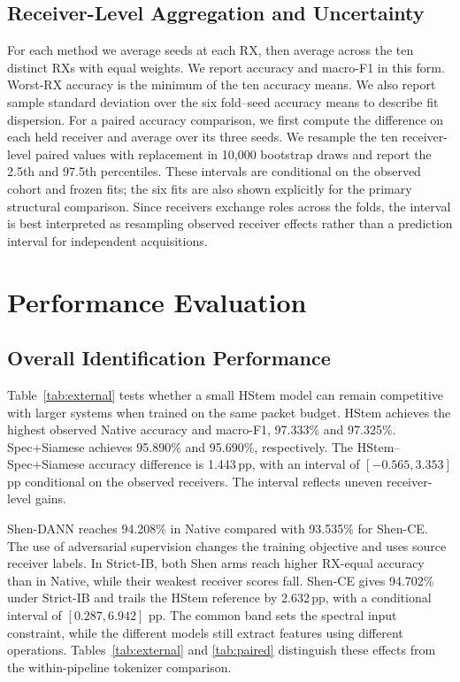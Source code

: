 \documentclass[journal]{IEEEtran}
\begin{document}
\subsection{Receiver-Level Aggregation and Uncertainty}
For each method we average seeds at each RX, then average across the ten distinct RXs with equal weights. We report accuracy and macro-F1 in this form. Worst-RX accuracy is the minimum of the ten accuracy means. We also report sample standard deviation over the six fold--seed accuracy means to describe fit dispersion. For a paired accuracy comparison, we first compute the difference on each held receiver and average over its three seeds. We resample the ten receiver-level paired values with replacement in 10,000 bootstrap draws and report the 2.5th and 97.5th percentiles. These intervals are conditional on the observed cohort and frozen fits; the six fits are also shown explicitly for the primary structural comparison. Since receivers exchange roles across the folds, the interval is best interpreted as resampling observed receiver effects rather than a prediction interval for independent acquisitions.

\section{Performance Evaluation}
\subsection{Overall Identification Performance}
Table~\ref{tab:external} tests whether a small HStem model can remain competitive with larger systems when trained on the same packet budget. HStem achieves the highest observed Native accuracy and macro-F1, 97.333\% and 97.325\%. Spec+Siamese achieves 95.890\% and 95.690\%, respectively. The HStem--Spec+Siamese accuracy difference is 1.443\,pp, with an interval of \([-0.565,3.353]\) pp conditional on the observed receivers. The interval reflects uneven receiver-level gains.

Shen-DANN reaches 94.208\% in Native compared with 93.535\% for Shen-CE. The use of adversarial supervision changes the training objective and uses source receiver labels. In Strict-IB, both Shen arms reach higher RX-equal accuracy than in Native, while their weakest receiver scores fall. Shen-CE gives 94.702\% under Strict-IB and trails the HStem reference by 2.632\,pp, with a conditional interval of \([0.287,6.942]\) pp. The common band sets the spectral input constraint, while the different models still extract features using different operations. Tables~\ref{tab:external} and \ref{tab:paired} distinguish these effects from the within-pipeline tokenizer comparison.
\end{document}
